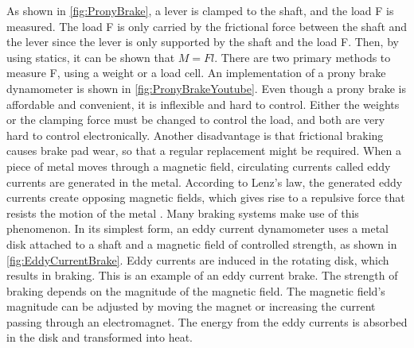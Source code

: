 {}\markdownRendererInterblockSeparator
{}As shown in \autoref{fig:PronyBrake}, a lever is clamped to the shaft, and the load F is measured. The load F is only carried by the frictional force between the shaft and the lever since the lever is only supported by the shaft and the load F. Then, by using statics, it can be shown that $M=Fl$. There are two primary methods to measure F, using a weight or a load cell.\markdownRendererInterblockSeparator
{}An implementation of a prony brake dynamometer is shown in \autoref{fig:PronyBrakeYoutube}.\markdownRendererInterblockSeparator
{}\markdownRendererInterblockSeparator
{}Even though a prony brake is affordable and convenient, it is inflexible and hard to control. Either the weights or the clamping force must be changed to control the load, and both are very hard to control electronically. Another disadvantage is that frictional braking causes brake pad wear, so that a regular replacement might be required.\markdownRendererInterblockSeparator
{}\markdownRendererInterblockSeparator
{}When a piece of metal moves through a magnetic field, circulating currents called eddy currents are generated in the metal. According to Lenz's law, the generated eddy currents create opposing magnetic fields, which gives rise to a repulsive force that resists the motion of the metal \cite{PhysicsBook}. Many braking systems make use of this phenomenon.\markdownRendererInterblockSeparator
{}In its simplest form, an eddy current dynamometer uses a metal disk attached to a shaft and a magnetic field of controlled strength, as shown in \autoref{fig:EddyCurrentBrake}. Eddy currents are induced in the rotating disk, which results in braking. This is an example of an eddy current brake. The strength of braking depends on the magnitude of the magnetic field. The magnetic field's magnitude can be adjusted by moving the magnet or increasing the current passing through an electromagnet. The energy from the eddy currents is absorbed in the disk and transformed into heat.\markdownRendererInterblockSeparator
{}\markdownRendererInterblockSeparator
